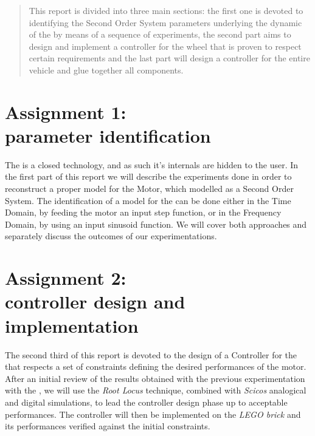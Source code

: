 \documentclass[12pt, a4paper, openany]{article}
\begin{document}
\begin{titlepage}
\begin{abstract}
This report is divided into three main sections: the first one is devoted to identifying the Second Order System parameters underlying the dynamic of the \LEGOMOTOR{} by means of a sequence of experiments, the second part aims to design and implement a controller for the wheel that is proven to respect certain requirements and the last part will design a controller for the entire vehicle and glue together all components. 
\end{abstract}

\end{titlepage}

\cleardoublepage
{}
\tableofcontents
\cleardoublepage
{}

\newpage
\setcounter{page}{1}



\section{Assignment 1:\\ \LEGOMOTOR{} parameter identification}

The \LEGOMOTOR{} is a closed technology, and as such it's internals are hidden to the user. In the first part of this report we will describe the experiments done in order to reconstruct a proper model for the Motor, which modelled as a Second Order System. The identification of a model for the \LEGOMOTOR{} can be done either in the Time Domain, by feeding the motor an input step function, or in the Frequency Domain, by using an input sinusoid function. We will cover both approaches and separately discuss the outcomes of our experimentations.


\newpage

\section{Assignment 2:\\ \LEGOMOTOR{} controller design and implementation}

The second third of this report is devoted to the design of a Controller for the \LEGOMOTOR{} that respects a set of constraints defining the desired performances of the motor. After an initial review of the results obtained with the previous experimentation with the \LEGOMOTOR{}, we will use the \emph{Root Locus} technique, combined with \textit{Scicos} analogical and digital simulations, to lead the controller design phase up to acceptable performances. The controller will then be implemented on the \textit{LEGO brick} and its performances verified against the initial constraints.
\end{document}

